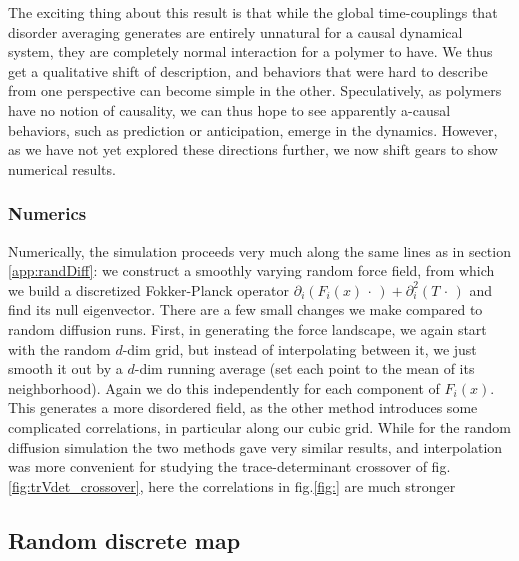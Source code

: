 \documentclass[reprint,prx]{revtex4-1}
\renewcommand{\=}[1]{\stackrel{#1}{=}} %
\renewcommand{\(}{\left (}
\renewcommand{\)}{\right  )}
\renewcommand{\[}{\left [}
\renewcommand{\]}{\right ]}
\newcommand{\<}{\left <}
\renewcommand{\>}{\right >}
\theoremstyle{definition}
\theoremstyle{remark}
\begin{document}
The exciting thing about this result is that while the global time-couplings that disorder averaging generates are entirely unnatural for a causal dynamical system, they are completely normal interaction for a polymer to have. We thus get a qualitative shift of description, and behaviors that were hard to describe from one perspective can become simple in the other. Speculatively, as polymers have no notion of causality, we can thus hope to see apparently a-causal behaviors, such as prediction or anticipation, emerge in the dynamics. However, as we have not yet explored these directions further, we now shift gears to show numerical results.

\subsubsection{Numerics}
Numerically, the simulation proceeds very much along the same lines as in section \ref{app:randDiff}: we construct a smoothly varying random force field, from which we build a discretized Fokker-Planck operator $ \partial_i(F_i(x)\,\cdot\,) + \partial_i^2(T\,\cdot\,) $ and find its null eigenvector. There are a few small changes we make compared to random diffusion runs. First, in generating the force landscape, we again start with the random $ d $-dim grid, but instead of interpolating between it, we just smooth it out by a $ d $-dim running average (set each point to the mean of its neighborhood). Again we do this independently for each component of $ F_i(x) $. This generates a more disordered field, as the other method introduces some complicated correlations, in particular along our cubic grid. While for the random diffusion simulation the two methods gave very similar results, and interpolation was more convenient for studying the trace-determinant crossover of fig.\ref{fig:trVdet_crossover}, here the correlations in fig.\ref{fig:} are much stronger  


\subsection{Random discrete map}


%

\end{document}
